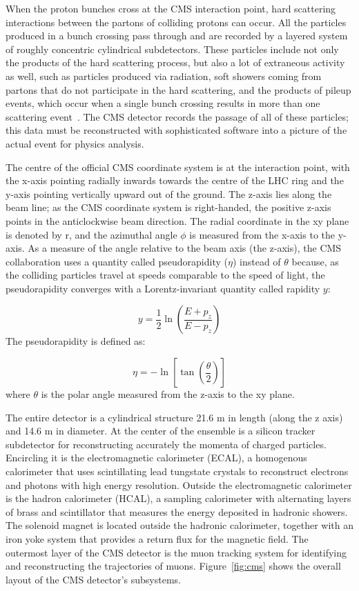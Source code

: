 When the proton bunches cross at the CMS interaction point, hard scattering interactions between the partons of colliding protons can occur. All the particles produced in a bunch crossing pass through and are recorded by a layered system of roughly concentric cylindrical subdetectors. These particles include not only the products of the hard scattering process, but also a lot of extraneous activity as well, such as particles produced via radiation, soft showers coming from partons that do not participate in the hard scattering, and the products of pileup events, which occur when a single bunch crossing results in more than one scattering event~\cite{Sjostrand:2006za}. The CMS detector records the passage of all of these particles; this data must be reconstructed with sophisticated software into a picture of the actual event for physics analysis.

The centre of the official CMS coordinate system is at the interaction point, with the x-axis pointing radially inwards towards the centre of the LHC ring and the y-axis pointing vertically upward out of the ground. The z-axis lies along the beam line; as the CMS coordinate system is right-handed, the positive z-axis points in the anticlockwise beam direction. The radial coordinate in the xy plane is denoted by r, and the azimuthal angle $\phi$ is measured from the x-axis to the y-axis. As a measure of the angle relative to the beam axis (the z-axis), the CMS collaboration uses a quantity called pseudorapidity ($\eta$) instead of $\theta$ because, as the colliding particles travel at speeds comparable to the speed of light, the pseudorapidity converges with a Lorentz-invariant quantity called rapidity $y$:

\begin{equation}
y = \frac{1}{2}\ln(\frac{E+p_{z}}{E-p_{z}})
\label{eq:rapidity}
\end{equation}
The pseudorapidity is defined as:

\begin{equation}
\eta = -\ln[\tan(\frac{\theta}{2})]
\label{eq:pseudorapidity}
\end{equation}
where $\theta$ is the polar angle measured from the z-axis to the xy plane.

The entire detector is a cylindrical structure 21.6 m in length (along the z axis) and 14.6 m in diameter. At the center of the ensemble is a silicon tracker subdetector for reconstructing accurately the momenta of charged particles. Encircling it is the electromagnetic calorimeter (ECAL), a homogenous calorimeter that uses scintillating lead tungstate crystals to reconstruct electrons and photons with high energy resolution. Outside the electromagnetic calorimeter is the hadron calorimeter (HCAL), a sampling calorimeter with alternating layers of brass and scintillator that measures the energy deposited in hadronic showers. The solenoid magnet is located outside the hadronic calorimeter, together with an iron yoke system that provides a return flux for the magnetic field. The outermost layer of the CMS detector is the muon tracking system for identifying and reconstructing the trajectories of muons. Figure~\ref{fig:cms} shows the overall layout of the CMS detector's subsystems.

